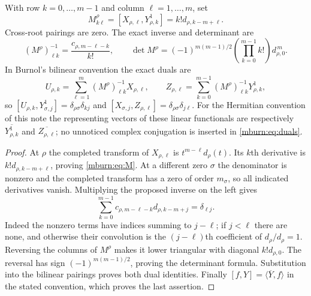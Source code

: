 \begin{mburntheorem}
\label{mburn:thm:jets}
With row $k=0,\ldots,m-1$ and column $\ell=1,\ldots,m$, set
\begin{equation}\label{mburn:eq:M}
 M^\rho_{k\ell}=[X_{\rho,\ell},Y^1_{\rho,k}]
        =k!d_{\rho,k-m+\ell}.
\end{equation}
Cross-root pairings are zero. The exact inverse and determinant are
\begin{equation}\label{mburn:eq:Minv}
 (M^\rho)^{-1}_{\ell k}=\frac{c_{\rho,m-\ell-k}}{k!},\qquad
 \det M^\rho=(-1)^{m(m-1)/2}
              \left(\prod_{k=0}^{m-1}k!\right)d_{\rho,0}^{\,m}.
\end{equation}
In Burnol's bilinear convention the exact duals are
\begin{equation}\label{mburn:eq:duals}
 U_{\rho,k}=\sum_{\ell=1}^{m}(M^\rho)^{-1}_{\ell k}X_{\rho,\ell},
 \qquad
 Z_{\rho,\ell}=\sum_{k=0}^{m-1}(M^\rho)^{-1}_{\ell k}Y^1_{\rho,k},
\end{equation}
so $[U_{\rho,k},Y^1_{\sigma,j}]=\delta_{\rho\sigma}\delta_{kj}$
and $[X_{\sigma,j},Z_{\rho,\ell}]=\delta_{\rho\sigma}\delta_{j\ell}$.
For the Hermitian convention of this note the representing vectors
of these linear functionals are respectively
$\overline{Y^1_{\rho,k}}$ and $\overline{Z_{\rho,\ell}}$;
no unnoticed complex conjugation is inserted in \eqref{mburn:eq:duals}.
\end{mburntheorem}
\begin{proof}
At $\rho$ the completed transform of $X_{\rho,\ell}$ is
$t^{m-\ell}d_\rho(t)$. Its $k$th derivative is
$k!d_{\rho,k-m+\ell}$, proving \eqref{mburn:eq:M}.
At a different zero $\sigma$ the denominator is nonzero and
the completed transform has a zero of order $m_\sigma$,
so all indicated derivatives vanish. Multiplying the proposed
inverse on the left gives
\[
 \sum_{k=0}^{m-1}c_{\rho,m-\ell-k}d_{\rho,k-m+j}
       =\delta_{\ell j}.
\]
Indeed the nonzero terms have indices summing to $j-\ell$;
if $j<\ell$ there are none, and otherwise their convolution
is the $(j-\ell)$th coefficient of $d_\rho/d_\rho=1$.
Reversing the columns of $M^\rho$ makes it lower triangular
with diagonal $k!d_{\rho,0}$. The reversal has sign
$(-1)^{m(m-1)/2}$, proving the determinant formula.
Substitution into the bilinear pairings proves both dual
identities. Finally $[f,Y]=\langle\overline Y,f\rangle$
in the stated convention, which proves the last assertion.
\end{proof}

